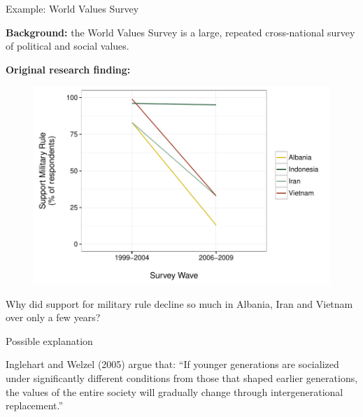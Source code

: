 \documentclass[10pt]{beamer}
\begin{document}
\begin{frame}{Example: World Values Survey}

    \textbf{Background:} the World Values Survey is a large, repeated cross-national survey of political and social values.

    \textbf{Original research finding:}

    \begin{figure}
        \includegraphics[scale=0.5]{img/wvs_compare.pdf}
    \end{figure}

\end{frame}

\begin{frame}

    \begin{center}
        {\large{Why did support for military rule decline so much in Albania, Iran and Vietnam over only a few years?}}

        \vspace{1cm}
    \end{center}

\end{frame}

\begin{frame}{Possible explanation}

    Inglehart and Welzel (2005) argue that: ``If younger generations are socialized under significantly different conditions from those that shaped earlier generations, the values of the entire society will gradually change through intergenerational replacement.''

\end{frame}
\end{document}
